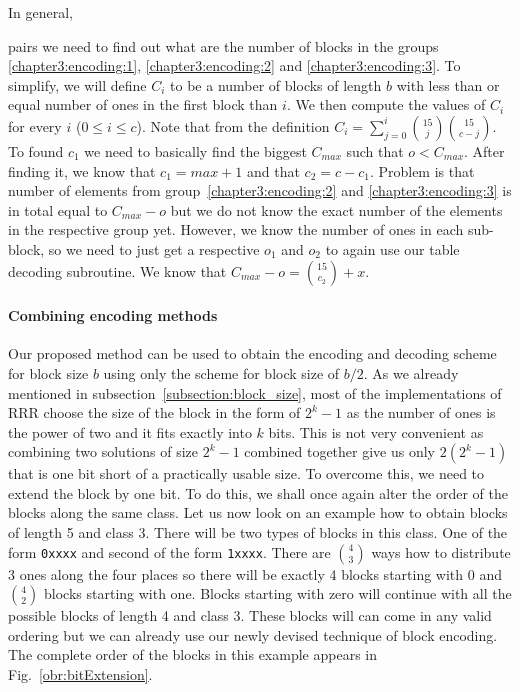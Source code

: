 
In general,

pairs we need to find out what are the number of blocks in the groups \ref{chapter3:encoding:1},
\ref{chapter3:encoding:2} and \ref{chapter3:encoding:3}. To simplify, we will define $C_i$ to be a 
number of blocks of length $b$ with less than or equal number of ones in the first block than $i$.
We then compute the values of $C_i$ for every $i$ ($0\leq i\leq c$). Note that from the definition
$C_i = \sum_{j=0}^{i} {15 \choose j} {15 \choose c-j}$. To found $c_1$ we need to basically find the
biggest $C_{max}$ such that $o<C_{max}$. After finding it, we know that $c_1 = max+1$ and that
$c_2 = c - c_1$. Problem is that number of elements from group~\ref{chapter3:encoding:2} and
\ref{chapter3:encoding:3} is in total equal to $C_{max}-o$ but we do not know the exact number
of the elements in the respective group yet. However, we know the number of ones in each sub-block,
so we need to just get a respective $o_1$ and $o_2$ to again use our table decoding subroutine. We
know that $C_{max}-o = {15 \choose c_2} + x$.

\paragraph{Combining encoding methods}

Our proposed method can be used to obtain the encoding and decoding scheme for block size $b$
using only the scheme for block size of $b/2$. As we already mentioned in
subsection~\ref{subsection:block_size}, most of the implementations of RRR choose the size
of the block in the form of $2^k-1$ as the number of ones is the power of two and it fits
exactly into $k$ bits. This is not very convenient as combining two solutions of size
$2^k-1$ combined together give us only $2(2^k-1)$ that is one bit short of a practically
usable size. To overcome this, we need to extend the block by one bit. To do this, we
shall once again alter the order of the blocks along the same class. Let us now look on
an example how to obtain blocks of length 5 and class 3. There will be two types of blocks
in this class. One of the form {\tt 0xxxx} and second of the form {\tt 1xxxx}. There are
${4\choose 3}$ ways how to distribute 3 ones along the four places so there will be exactly
4 blocks starting with 0 and ${4\choose 2}$ blocks starting with one. Blocks starting with
zero will continue with all the possible blocks of length 4 and class 3. These blocks will
can come in any valid ordering but we can already use our newly devised technique of block
encoding. The complete order of the blocks in this example appears in Fig.~\ref{obr:bitExtension}.

